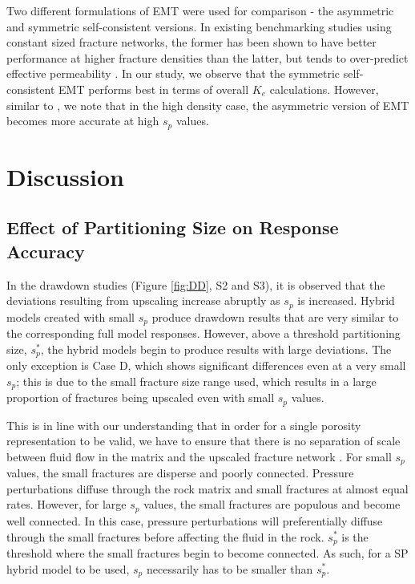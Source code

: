 \documentclass[draft]{agujournal2018}
\begin{document}
Two different formulations of EMT were used for comparison - the asymmetric and symmetric self-consistent versions. In existing benchmarking studies using constant sized fracture networks, the former has been shown to have better performance at higher fracture densities than the latter, but tends to over-predict effective permeability \citep{Saevik2013, Saevik2014}. In our study, we observe that the symmetric self-consistent EMT performs best in terms of overall $K_e$ calculations. However, similar to \citet{Saevik2013}, we note that in the high density case, the asymmetric version of EMT becomes more accurate at high $s_p$ values.

\section{Discussion}
\subsection{Effect of Partitioning Size on Response Accuracy}
In the drawdown studies (Figure \ref{fig:DD}, S2 and S3), it is observed that the deviations resulting from upscaling increase abruptly as $s_p$ is increased. Hybrid models created with small $s_p$ produce drawdown results that are very similar to the corresponding full model responses. However, above a threshold partitioning size, $s_p^*$, the hybrid models begin to produce results with large deviations. The only exception is Case D, which shows significant differences even at a very small $s_p$; this is due to the small fracture size range used, which results in a large proportion of fractures being upscaled even with small $s_p$ values.

This is in line with our understanding that in order for a single porosity representation to be valid, we have to ensure that there is no separation of scale between fluid flow in the matrix and the upscaled fracture network \citep{Matthai2004a}. For small $s_p$ values, the small fractures are disperse and poorly connected. Pressure perturbations diffuse through the rock matrix and small fractures at almost equal rates. However, for large $s_p$ values, the small fractures are populous and become well connected. In this case, pressure perturbations will preferentially diffuse through the small fractures before affecting the fluid in the rock. $s_p^*$ is the threshold where the small fractures begin to become connected. As such, for a SP hybrid model to be used, $s_p$ necessarily has to be smaller than $s_p^*$.
\end{document}
